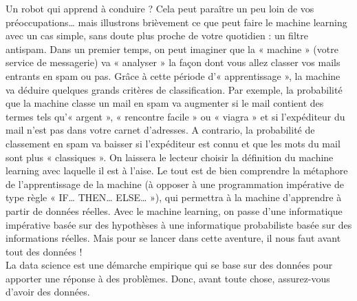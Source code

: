 \documentclass[11pt]{report}
\begin{document}
Un robot qui apprend à conduire ? Cela peut paraître un peu loin de vos préoccupations…
mais illustrons brièvement ce que peut faire le machine learning avec un cas simple, sans
doute plus proche de votre quotidien : un filtre antispam. Dans un premier temps, on peut
imaginer que la « machine » (votre service de messagerie) va « analyser » la façon dont
vous allez classer vos mails entrants en spam ou pas. Grâce à cette période
d’« apprentissage », la machine va déduire quelques grands critères de classification. Par
exemple, la probabilité que la machine classe un mail en spam va augmenter si le mail
contient des termes tels qu’« argent », « rencontre facile » ou « viagra » et si l’expéditeur
du mail n’est pas dans votre carnet d’adresses. A contrario, la probabilité de classement en
spam va baisser si l’expéditeur est connu et que les mots du mail sont plus « classiques ».
On laissera le lecteur choisir la définition du machine learning avec laquelle il est à l’aise.
Le tout est de bien comprendre la métaphore de l’apprentissage de la machine (à opposer à
une programmation impérative de type règle « IF… THEN… ELSE… »), qui permettra à
la machine d’apprendre à partir de données réelles. Avec le machine learning, on passe
d’une informatique impérative basée sur des hypothèses à une informatique probabiliste
basée sur des informations réelles. Mais pour se lancer dans cette aventure, il nous faut
avant tout des données !\\
La data science est une démarche empirique qui se base sur des données pour apporter une
réponse à des problèmes. Donc, avant toute chose, assurez-vous d’avoir des données.\\
\end{document}
